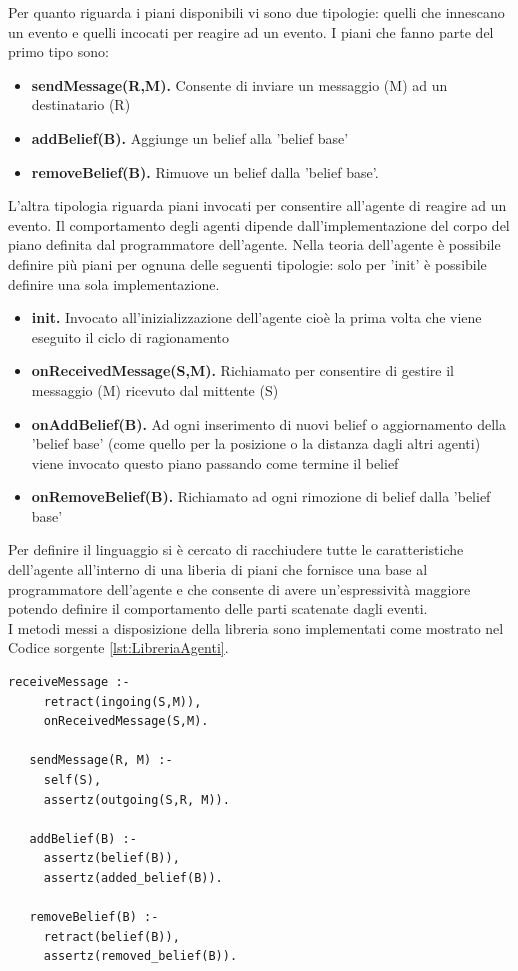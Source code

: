 \documentclass[12pt,a4paper,openright,twoside]{report}
\begin{document}
Per quanto riguarda i piani disponibili vi sono due tipologie: quelli che innescano un evento e quelli incocati per reagire ad un evento.
I piani che fanno parte del primo tipo sono:
\begin{itemize}
   \item \textbf{sendMessage(R,M).} Consente di inviare un messaggio (M) ad un destinatario (R)
   \item \textbf{addBelief(B).} Aggiunge un belief alla 'belief base'
   \item \textbf{removeBelief(B).} Rimuove un belief dalla 'belief base'.
\end{itemize}
L'altra tipologia riguarda piani invocati per consentire all'agente di reagire ad un evento. Il comportamento degli agenti dipende dall'implementazione del corpo del piano definita dal programmatore dell'agente. Nella teoria dell'agente \`e possibile definire pi\`u piani per ognuna delle seguenti tipologie: solo per 'init' \`e possibile definire una sola implementazione.
\begin{itemize}
   \item \textbf{init.} Invocato all'inizializzazione dell'agente cio\`e la prima volta che viene eseguito il ciclo di ragionamento
   \item \textbf{onReceivedMessage(S,M).} Richiamato per consentire di gestire il messaggio (M) ricevuto dal mittente (S)
   \item \textbf{onAddBelief(B).} Ad ogni inserimento di nuovi belief o aggiornamento della 'belief base' (come quello per la posizione o la distanza dagli altri agenti) viene invocato questo piano passando come termine il belief
   \item \textbf{onRemoveBelief(B).} Richiamato ad ogni rimozione di belief dalla 'belief base'
\end{itemize}

Per definire il linguaggio si \`e cercato di racchiudere tutte le caratteristiche dell'agente all'interno di una liberia di piani che fornisce una base al programmatore dell'agente e che consente di avere un'espressivit\`a maggiore potendo definire il comportamento delle parti scatenate dagli eventi.
\\
I metodi messi a disposizione della libreria sono implementati come mostrato nel Codice sorgente \ref{lst:LibreriaAgenti}.
\medskip
\begin{lstlisting}[firstnumber=1,label={lst:LibreriaAgenti},caption={Libreria agenti}]
   receiveMessage :-
     retract(ingoing(S,M)),
     onReceivedMessage(S,M).

   sendMessage(R, M) :-
     self(S),
     assertz(outgoing(S,R, M)).

   addBelief(B) :-
     assertz(belief(B)),
     assertz(added_belief(B)).

   removeBelief(B) :-
     retract(belief(B)),
     assertz(removed_belief(B)).
\end{lstlisting}
\end{document}
